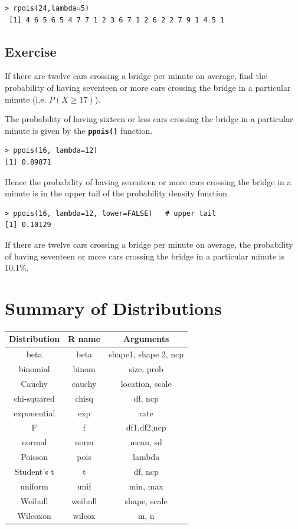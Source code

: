 \documentclass[a4paper,12pt]{article}
\begin{document}
\begin{verbatim}
> rpois(24,lambda=5)
 [1] 4 6 5 6 5 4 7 7 1 2 3 6 7 1 2 6 2 2 7 9 1 4 5 1
\end{verbatim}

\subsection{Exercise}

If there are twelve cars crossing a bridge per minute on average, find the probability of having seventeen or more cars crossing the bridge in a particular minute (i.e. $P(X\geq 17)$). 

The probability of having sixteen or less cars crossing the bridge in a particular minute is given by the  \texttt{\textbf{ppois()}} function. 
\begin{verbatim}
> ppois(16, lambda=12)   
[1] 0.89871 
\end{verbatim}

Hence the probability of having seventeen or more cars crossing the bridge in a minute is in the upper tail of the probability density function. 
\begin{verbatim}
> ppois(16, lambda=12, lower=FALSE)   # upper tail 
[1] 0.10129 
\end{verbatim}

If there are twelve cars crossing a bridge per minute on average, the probability of having seventeen or more cars crossing the bridge in a particular minute is 10.1\%. 







\section{Summary of Distributions}
\begin{center}
\begin{tabular}{|c|c|c|}
\hline
Distribution &	R name & Arguments\\ \hline
beta &	beta &	shape1, shape 2, ncp\\
binomial &	binom	& size, prob\\
Cauchy	& cauchy	& location, scale\\
chi-squared &	chisq &	df, ncp\\
exponential	& exp &	rate\\
F	& f	& df1,df2,ncp\\
normal &	norm &	mean, sd\\
Poisson&	pois & 	lambda\\
Student's t	& t&	df, ncp\\
uniform	& unif &	min, max\\
Weibull	& weibull & shape, scale\\
Wilcoxon &	wilcox &	m, n\\ 
\hline 
\end{tabular}
\end{center}
 
 
\end{document}

